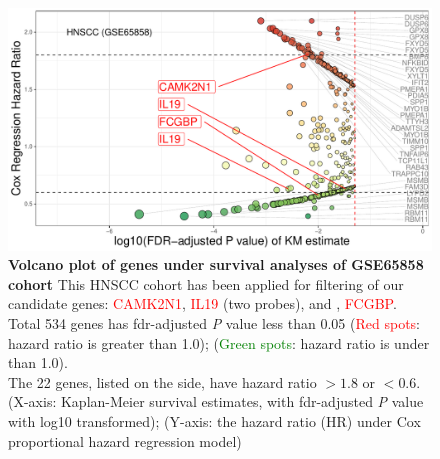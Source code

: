 \documentclass[preprint,12pt]{elsarticle}
\newcommand{\bcaption}[2]{\caption{\textbf{#1} #2}}
\newenvironment{MyColorPar}[1]{%
    \leavevmode\color{#1}\ignorespaces%
}{%
}%
\begin{document}
\begin{MyColorPar}{blue}
\begin{figure}
    \centering
    \includegraphics[width=13cm]{Rplot_GSE65858_CoxHR_CAMK2N1_top3FDRKM.pdf}
    \bcaption{Volcano plot of genes under survival analyses of GSE65858 cohort}{
    This HNSCC cohort has been applied for filtering of our candidate genes: \textcolor{red}{CAMK2N1}, \textcolor{red}{IL19} (two probes), and , \textcolor{red}{FCGBP}.
    Total 534 genes has \acrshort{fdr}-adjusted \textit{P} value less than 0.05
    (\textcolor{red}{Red spots}: hazard ratio is greater than 1.0);
    (\textcolor{green}{Green spots}: hazard ratio is under than 1.0).\\
    The 22 genes, listed on the side, have hazard ratio $> 1.8$ or $< 0.6$.\\
    (X-axis: Kaplan-Meier survival estimates, with \acrshort{fdr}-adjusted \textit{P} value with log10 transformed);
    (Y-axis: the hazard ratio (HR) under Cox proportional hazard regression model)
    }
    \label{fig:hazards534}
\end{figure}







\end{MyColorPar}
\end{document}
